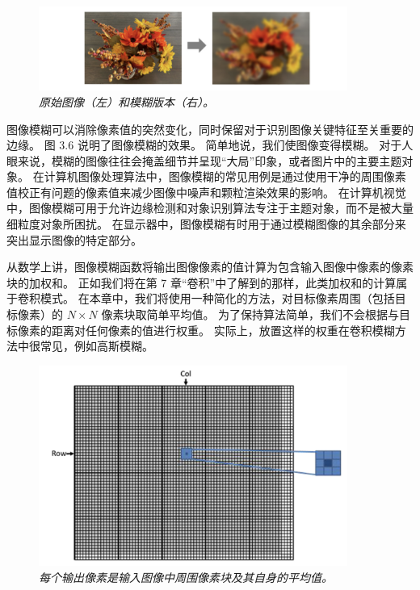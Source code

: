 \begin{figure}[H]
	\centering
	\includegraphics[width=0.9\textwidth]{figs/F3.6.png}
	\caption{\textit{原始图像（左）和模糊版本（右）。}}
\end{figure}

图像模糊可以消除像素值的突然变化，同时保留对于识别图像关键特征至关重要的边缘。 图 3.6 说明了图像模糊的效果。 
简单地说，我们使图像变得模糊。 对于人眼来说，模糊的图像往往会掩盖细节并呈现“大局”印象，或者图片中的主要主题对象。 
在计算机图像处理算法中，图像模糊的常见用例是通过使用干净的周围像素值校正有问题的像素值来减少图像中噪声和颗粒渲染效果的影响。 
在计算机视觉中，图像模糊可用于允许边缘检测和对象识别算法专注于主题对象，而不是被大量细粒度对象所困扰。 
在显示器中，图像模糊有时用于通过模糊图像的其余部分来突出显示图像的特定部分。

从数学上讲，图像模糊函数将输出图像像素的值计算为包含输入图像中像素的像素块的加权和。 
正如我们将在第 7 章“卷积”中了解到的那样，此类加权和的计算属于卷积模式。 
在本章中，我们将使用一种简化的方法，对目标像素周围（包括目标像素）的 $N \times N$ 像素块取简单平均值。 
为了保持算法简单，我们不会根据与目标像素的距离对任何像素的值进行权重。 
实际上，放置这样的权重在卷积模糊方法中很常见，例如高斯模糊。

\begin{figure}[H]
	\centering
	\includegraphics[width=0.9\textwidth]{figs/F3.7.png}
	\caption{\textit{每个输出像素是输入图像中周围像素块及其自身的平均值。}}
\end{figure}

